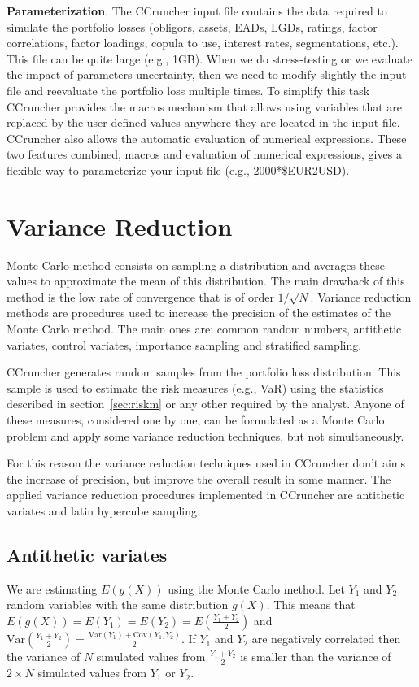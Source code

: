 \documentclass[11pt,fleqn]{book} %
\begin{document}
\textbf{Parameterization}. 
The CCruncher input file contains the data required to simulate the portfolio
losses (obligors, assets, EADs, LGDs, ratings, factor correlations, factor
loadings, copula to use, interest rates, segmentations, etc.). This file can 
be quite large (e.g., 1GB). When we do stress-testing or we evaluate the impact 
of parameters uncertainty, then we need to modify slightly the input file and 
reevaluate the portfolio loss multiple times. To simplify this task CCruncher 
provides the macros mechanism that allows using variables that are replaced by 
the user-defined values anywhere they are located in the input file. CCruncher 
also allows the automatic evaluation of numerical expressions. These two 
features combined, macros and evaluation of numerical expressions, gives a 
flexible way to parameterize your input file (e.g., 2000*\$EUR2USD). 

\section{Variance Reduction}

Monte Carlo method consists on sampling a distribution and averages these
values to approximate the mean of this distribution. The main drawback 
of this method is the low rate of convergence that is of order $1/\sqrt{N}$.
Variance reduction methods are procedures used to increase the precision 
of the estimates of the Monte Carlo method. The main ones are: common random 
numbers, antithetic variates, control variates, importance sampling and 
stratified sampling.

CCruncher generates random samples from the portfolio loss distribution.
This sample is used to estimate the risk measures (e.g., VaR) using the 
statistics described in section~\ref{sec:riskm} or any other required 
by the analyst. Anyone of these measures, considered one by one, can be 
formulated as a Monte Carlo problem and apply some variance 
reduction techniques, but not simultaneously. 

For this reason the variance reduction techniques used in CCruncher 
don't aims the increase of precision, but improve the overall result in 
some manner. The applied variance reduction procedures implemented in
CCruncher are antithetic variates and latin hypercube sampling.

\subsection{Antithetic variates}
We are estimating $E(g(X))$ using the Monte 
Carlo method. Let $Y_1$ and $Y_2$ random variables with the same distribution
$g(X)$. This means that $E(g(X)) = E(Y_1) = E(Y_2) = E(\frac{Y_1+Y_2}{2})$ and
$\text{Var}\left(\frac{Y_1+Y_2}{2}\right) = 
\frac{\text{Var}(Y_1)+\text{Cov}(Y_1,Y_2)}{2}$.
If $Y_1$ and $Y_2$ are negatively correlated then the variance of $N$ 
simulated values from $\frac{Y_1+Y_2}{2}$ is smaller than the variance 
of $2{\times}N$ simulated values from $Y_1$ or $Y_2$.
\end{document}
